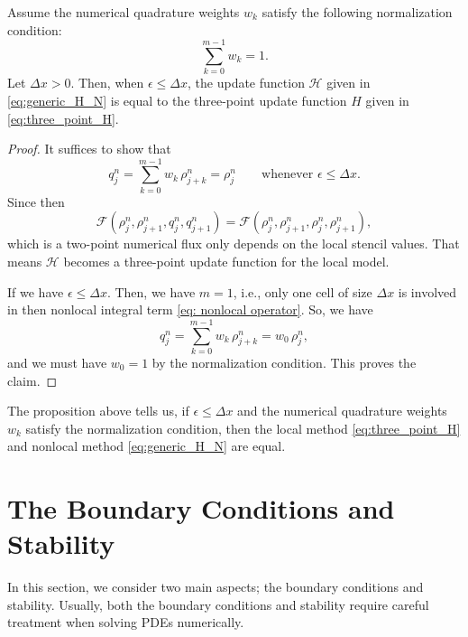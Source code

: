 \begin{proposition}\label{pro:nonlocal_to_local_limit}
    Assume the numerical quadrature weights $w_k$ satisfy the following normalization condition: \\
    \[
        \sum_{k=0}^{m-1} w_k = 1.
    \]
    Let $\Delta x > 0$. Then, when $\epsilon \leq \Delta x$, the update function $\mathcal{H}$ given in \eqref{eq:generic_H_N} is equal to the three-point update function $H$ given in \eqref{eq:three_point_H}.
\end{proposition}
\begin{proof}
    It suffices to show that
    \[ q_{j}^{n}= \sum_{k=0}^{m-1} w_k \, \rho_{j+k}^{n} = \rho_{j}^{n} \qquad \text{whenever } \epsilon \leq \Delta x.
    \]
    Since then
    \[
        \mathcal{F}(\rho_{j}^{n},\rho_{j+1}^{n},q_{j}^{n},q_{j+1}^{n}) = \mathcal{F}(\rho_{j}^{n},\rho_{j+1}^{n},\rho_{j}^{n},\rho_{j+1}^{n}),
    \]
    which is a two-point numerical flux only depends on the local stencil values. That means $\mathcal{H}$ becomes a three-point update function for the local model.

    If we have $\epsilon \leq \Delta x$. Then, we have $m=1$, i.e., only one cell of size $\Delta x$ is involved in then nonlocal integral term \eqref{eq: nonlocal operator}. So, we have
    \[ q_{j}^{n}= \sum_{k=0}^{m-1} w_k \, \rho_{j+k}^{n} = w_0 \, \rho_{j}^{n}, \]
    and we must have $w_0=1$ by the normalization condition. This proves the claim.
\end{proof}
The proposition above tells us, if $\epsilon \leq \Delta x$ and the numerical quadrature weights $w_k$ satisfy the normalization condition, then the local method \eqref{eq:three_point_H} and nonlocal method \eqref{eq:generic_H_N} are equal.


\section{The Boundary Conditions and Stability}
In this section, we consider two main aspects; the boundary conditions and stability. Usually, both the boundary conditions and stability require careful treatment when solving PDEs numerically.
